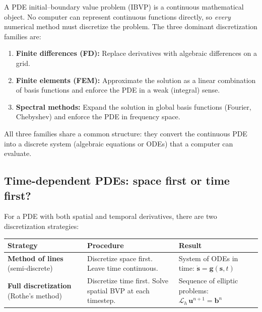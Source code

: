 \documentclass[11pt]{article}
\newcommand{\vect}[1]{\mathbf{#1}}
\begin{document}
A PDE initial--boundary value problem (IBVP) is a continuous mathematical object.
No computer can represent continuous functions directly, so \emph{every} numerical method must discretize the problem.
The three dominant discretization families are:

\begin{enumerate}
  \item \textbf{Finite differences (FD):} Replace derivatives with algebraic differences on a grid.
  \item \textbf{Finite elements (FEM):} Approximate the solution as a linear combination of basis functions and enforce the PDE in a weak (integral) sense.
  \item \textbf{Spectral methods:} Expand the solution in global basis functions (Fourier, Chebyshev) and enforce the PDE in frequency space.
\end{enumerate}

All three families share a common structure: they convert the continuous PDE into a discrete system (algebraic equations or ODEs) that a computer can evaluate.

\subsection{Time-dependent PDEs: space first or time first?}

For a PDE with both spatial and temporal derivatives, there are two discretization strategies:

\begin{table}[H]
\centering
\renewcommand{\arraystretch}{1.3}
\begin{tabular}{@{}lp{5.2cm}p{5.2cm}@{}}
\toprule
\textbf{Strategy} & \textbf{Procedure} & \textbf{Result} \\
\midrule
\textbf{Method of lines} \newline (semi-discrete) &
  Discretize space first. \newline Leave time continuous. &
  System of ODEs in time: $\dot{\vect{s}} = \vect{g}(\vect{s}, t)$ \\[6pt]
\textbf{Full discretization} \newline (Rothe's method) &
  Discretize time first. \newline Solve spatial BVP at each timestep. &
  Sequence of elliptic problems: $\mathcal{L}_h\,\vect{u}^{n+1} = \vect{b}^n$ \\
\bottomrule
\end{tabular}
\end{table}
\end{document}
